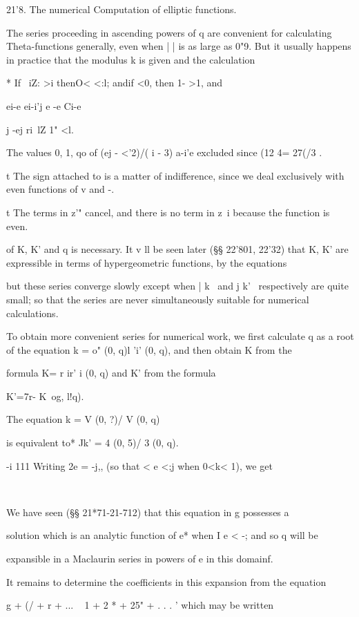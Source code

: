 21'8. The numerical Computation of elliptic functions.

The series proceeding in ascending powers of q are convenient for
calculating Theta-functions generally, even when | | is as large as
0"9. But it usually happens in practice that the modulus k is given
and the calculation

* If \ iZ: >i thenO< <:l; andif <0, then 1- >1, and

ei-e ei-i'j e -e Ci-e

 j -ej ri\ lZ 1" <l.

The values 0, 1, qo of (ej - <'2)/( i - 3) a-i'e excluded since (12 4=
27(/3 .

t The sign attached to is a matter of indifference, since we deal
exclusively with even functions of v and -.

t The terms in z'" cancel, and there is no term in z~i because the
function is even.

%
%

of K, K' and q is necessary. It v ll be seen later (§§ 22'801, 22'32)
that K, K' are expressible in terms of hypergeometric functions, by
the equations

but these series converge slowly except when | k \ and j k' \
respectively are quite small; so that the series are never
simultaneously suitable for numerical calculations.

To obtain more convenient series for numerical work, we first
calculate q as a root of the equation k = o" (0, q)l 'i' (0, q), and
then obtain K from the

formula K= r ir' i (0, q) and K' from the formula

K'=7r- K\ og, l!q).

The equation k = V (0, ?)/ V (0, q)

is equivalent to* Jk' = 4 (0, 5)/ 3 (0, q).

-i 111 Writing 2e = -j,, (so that < e <;j when 0<k< 1), we get

\ %

We have seen (§§ 21*71-21-712) that this equation in g possesses a

solution which is an analytic function of e* when I e < -; and so q
will be

expansible in a Maclaurin series in powers of e in this domainf.

It remains to determine the coefficients in this expansion from the
equation

g + (/ + r + ... ~ 1 + 2 * + 25" + . . . ' which may be written


